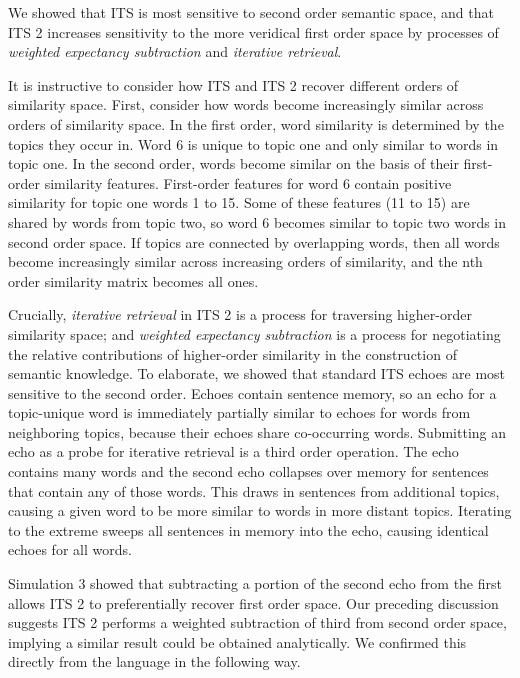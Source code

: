\documentclass[10pt,letterpaper]{article}
\begin{document}
We showed that ITS is most sensitive to second order semantic space, and that ITS 2 increases sensitivity to the more veridical first order space by processes of \emph{weighted expectancy subtraction} and \emph{iterative retrieval}.

It is instructive to consider how ITS and ITS 2 recover different orders of similarity space. First, consider how words become increasingly similar across orders of similarity space. In the first order, word similarity is determined by the topics they occur in. Word 6 is unique to topic one and only similar to words in topic one. In the second order, words become similar on the basis of their first-order similarity features. First-order features for word 6 contain positive similarity for topic one words 1 to 15. Some of these features (11 to 15) are shared by words from topic two, so word 6 becomes similar to topic two words in second order space. If topics are connected by overlapping words, then all words become increasingly similar across increasing orders of similarity, and the nth order similarity matrix becomes all ones.

Crucially, \emph{iterative retrieval} in ITS 2 is a process for traversing higher-order similarity space; and \emph{weighted expectancy subtraction} is a process for negotiating the relative contributions of higher-order similarity in the construction of semantic knowledge. To elaborate, we showed that standard ITS echoes are most sensitive to the second order. Echoes contain sentence memory, so an echo for a topic-unique word is immediately partially similar to echoes for words from neighboring topics, because their echoes share co-occurring words. Submitting an echo as a probe for iterative retrieval is a third order operation. The echo contains many words and the second echo collapses over memory for sentences that contain any of those words. This draws in sentences from additional topics, causing a given word to be more similar to words in more distant topics. Iterating to the extreme sweeps all sentences in memory into the echo, causing identical echoes for all words.

Simulation 3 showed that subtracting a portion of the second echo from the first allows ITS 2 to preferentially recover first order space. Our preceding discussion suggests ITS 2 performs a weighted subtraction of third from second order space, implying a similar result could be obtained analytically. We confirmed this directly from the language in the following way.
\end{document}

